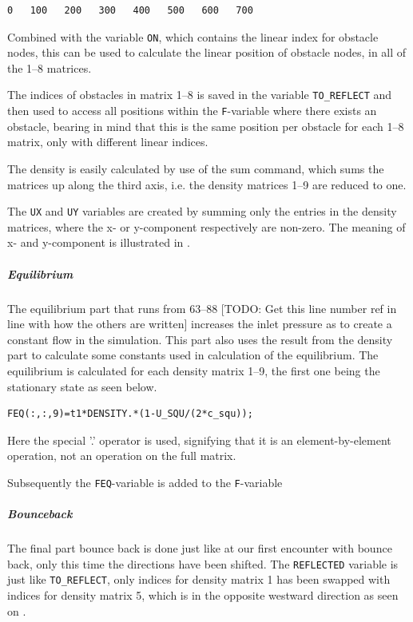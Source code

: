 \begin{verbatim}
0   100   200   300   400   500   600   700
\end{verbatim}

Combined with the variable \texttt{ON}, which contains the linear index for obstacle nodes, this can be used to calculate the linear position of obstacle nodes, in all of the 1--8 matrices.

The indices of obstacles in matrix 1--8 is saved in the variable \texttt{TO\_REFLECT} and then used to access all positions within the \texttt{F}-variable where there exists an obstacle, bearing in mind that this is the same position per obstacle for each 1--8 matrix, only with different linear indices.

The density is easily calculated by use of the sum command, which sums the matrices up along the third axis, i.e. the density matrices 1--9 are reduced to one.

The \texttt{UX} and \texttt{UY} variables are created by summing only the entries in the density matrices, where the x- or y-component respectively are non-zero. The meaning of x- and y-component is illustrated in .


\subparagraph*{Equilibrium}
The equilibrium part that runs from 63--88 [TODO: Get this line number ref in line with how the others are written] increases the inlet pressure as to create a constant flow in the simulation. This part also uses the result from the density part to calculate some constants used in calculation of the equilibrium. The equilibrium is calculated for each density matrix 1--9, the first one being the stationary state as seen below.

\begin{verbatim}
FEQ(:,:,9)=t1*DENSITY.*(1-U_SQU/(2*c_squ));
\end{verbatim}

Here the special '.' operator is used, signifying that it is an element-by-element operation, not an operation on the full matrix.

Subsequently the \texttt{FEQ}-variable is added to the \texttt{F}-variable

\subparagraph*{Bounceback}
The final part bounce back is done just like at our first encounter with bounce back, only this time the directions have been shifted. The \texttt{REFLECTED} variable is just like \texttt{TO\_REFLECT}, only indices for density matrix 1 has been swapped with indices for density matrix 5, which is in the opposite westward direction as seen on .



